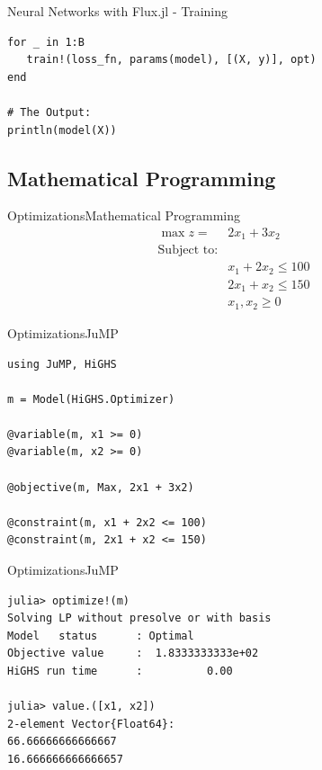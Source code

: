 \documentclass[11pt]{beamer}
\begin{document}
\begin{frame}[fragile]{Neural Networks with Flux.jl - Training}
\begin{lstlisting}[basicstyle=\small]
for _ in 1:B
   train!(loss_fn, params(model), [(X, y)], opt)
end 

# The Output:
println(model(X))
\end{lstlisting}
\end{frame}


\subsection{Mathematical Programming}
\begin{frame}[fragile]{Optimizations}{Mathematical Programming}
$$
\begin{aligned}
\max z = & 2x_1 + 3x_2 \\
\text{Subject to:}\\
& x_1 + 2x_2 \le 100 \\
& 2x_1 + x_2 \le 150 \\
& x_1, x_2 \ge 0
\end{aligned}
$$
\end{frame}

\begin{frame}[fragile]{Optimizations}{JuMP}
\begin{lstlisting}[basicstyle=\small]
using JuMP, HiGHS

m = Model(HiGHS.Optimizer)

@variable(m, x1 >= 0)
@variable(m, x2 >= 0)

@objective(m, Max, 2x1 + 3x2)

@constraint(m, x1 + 2x2 <= 100)
@constraint(m, 2x1 + x2 <= 150)
\end{lstlisting}
\end{frame}


\begin{frame}[fragile]{Optimizations}{JuMP}
\begin{lstlisting}
julia> optimize!(m)
Solving LP without presolve or with basis
Model   status      : Optimal
Objective value     :  1.8333333333e+02
HiGHS run time      :          0.00

julia> value.([x1, x2])
2-element Vector{Float64}:
66.66666666666667
16.666666666666657	
\end{lstlisting}
\end{frame}
\end{document}
